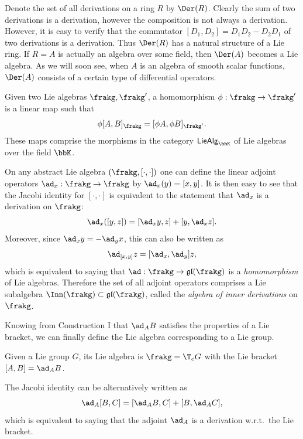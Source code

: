 \begin{example}
    Denote the set of all derivations on a ring $R$ by $\Der(R)$. Clearly the sum of two derivations is a derivation, however the composition is not always a derivation. However, it is easy to verify that the commutator $[D_1,D_2]=D_1D_2-D_2D_1$ of two derivations is a derivation. Thus $\Der(R)$ has a natural structure of a Lie ring. If $R=A$ is actually an algebra over some field, then $\Der(A)$ becomes a Lie algebra. As we will soon see, when $A$ is an algebra of smooth scalar functions, $\Der(A)$ consists of a certain type of differential operators.
\end{example}



\begin{defn}
    Given two Lie algebras $\frakg,\frakg'$, a homomorphism $\phi:\frakg\to\frakg'$ is a linear map such that 
    \[\phi[A,B]_{\frakg}=[\phi A,\phi B]_{\frakg'}.\]
    These maps comprise the morphisms in the category $\mathsf{LieAlg}_{\bbK}$ of Lie algebras over the field $\bbK$.
\end{defn}


\begin{example}
    On any abstract Lie algebra $(\frakg,[\cdot,\cdot])$ one can define the linear adjoint operators $\ad_x:\frakg\to\frakg$ by $\ad_x(y)=[x,y]$. It is then easy to see that the Jacobi identity for $[\cdot,\cdot]$ is equivalent to the statement that $\ad_x$ is a derivation on $\frakg$:
    \[\ad_x([y,z])=[\ad_x y,z]+[y,\ad_x z].\]
    Moreover, since $\ad_x y=-\ad_y x$, this can also be written as
    \[\ad_{[x,y]}z=[\ad_x,\ad_y]z,\]
    which is equivalent to saying that $\ad:\frakg\to \mathfrak{gl}(\frakg)$ is a \emph{homomorphism} of Lie algebras. Therefore the set of all adjoint operators comprises a Lie subalgebra $\Inn(\frakg)\subset \mathfrak{gl}(\frakg)$, called the \emph{algebra of inner derivations} on $\frakg$.
\end{example}



Knowing from Construction I that $\ad_A B$ satisfies the properties of a Lie bracket, we can finally define the Lie algebra corresponding to a Lie group.

\begin{defn}
    Given a Lie group $G$, its Lie algebra is $\frakg=\T_e  G$ with the Lie bracket $[A,B]=\ad_A B$. 
    
    The Jacobi identity can be alternatively written as
    \[\ad_A[B,C]=[\ad_A B,C]+[B,\ad_A C],\]
    which is equivalent to saying that the adjoint $\ad_A$ is a derivation w.r.t.\ the Lie bracket. 
\end{defn}

